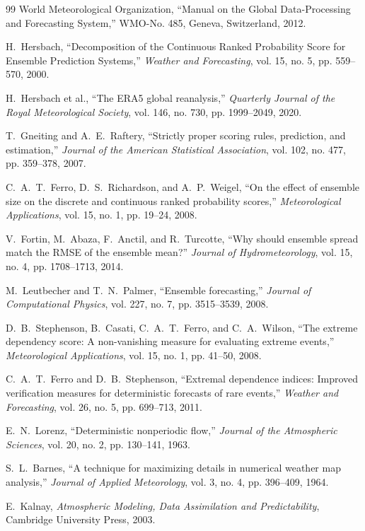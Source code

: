 \documentclass[10pt,twocolumn,letterpaper]{article}
\begin{document}
\begin{thebibliography}{99}
World Meteorological Organization, ``Manual on the Global Data-Processing and Forecasting System,'' WMO-No. 485, Geneva, Switzerland, 2012.

H.~Hersbach, ``Decomposition of the Continuous Ranked Probability Score for Ensemble Prediction Systems,'' \emph{Weather and Forecasting}, vol. 15, no. 5, pp. 559--570, 2000.

H.~Hersbach et al., ``The ERA5 global reanalysis,'' \emph{Quarterly Journal of the Royal Meteorological Society}, vol. 146, no. 730, pp. 1999--2049, 2020.

T.~Gneiting and A.~E.~Raftery, ``Strictly proper scoring rules, prediction, and estimation,'' \emph{Journal of the American Statistical Association}, vol. 102, no. 477, pp. 359--378, 2007.

C.~A.~T.~Ferro, D.~S.~Richardson, and A.~P.~Weigel, ``On the effect of ensemble size on the discrete and continuous ranked probability scores,'' \emph{Meteorological Applications}, vol. 15, no. 1, pp. 19--24, 2008.

V.~Fortin, M.~Abaza, F.~Anctil, and R.~Turcotte, ``Why should ensemble spread match the RMSE of the ensemble mean?'' \emph{Journal of Hydrometeorology}, vol. 15, no. 4, pp. 1708--1713, 2014.

M.~Leutbecher and T.~N.~Palmer, ``Ensemble forecasting,'' \emph{Journal of Computational Physics}, vol. 227, no. 7, pp. 3515--3539, 2008.

D.~B.~Stephenson, B.~Casati, C.~A.~T.~Ferro, and C.~A.~Wilson, ``The extreme dependency score: A non-vanishing measure for evaluating extreme events,'' \emph{Meteorological Applications}, vol. 15, no. 1, pp. 41--50, 2008.

C.~A.~T.~Ferro and D.~B.~Stephenson, ``Extremal dependence indices: Improved verification measures for deterministic forecasts of rare events,'' \emph{Weather and Forecasting}, vol. 26, no. 5, pp. 699--713, 2011.

E.~N.~Lorenz, ``Deterministic nonperiodic flow,'' \emph{Journal of the Atmospheric Sciences}, vol. 20, no. 2, pp. 130--141, 1963.

S.~L.~Barnes, ``A technique for maximizing details in numerical weather map analysis,'' \emph{Journal of Applied Meteorology}, vol. 3, no. 4, pp. 396--409, 1964.

E.~Kalnay, \emph{Atmospheric Modeling, Data Assimilation and Predictability}, Cambridge University Press, 2003.
\end{thebibliography}
\end{document}
